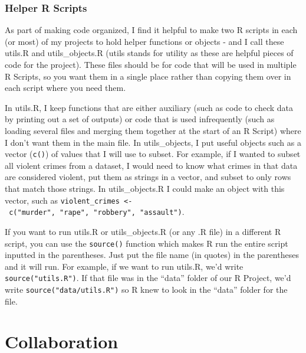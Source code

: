\documentclass[
  12pt,
]{book}
\begin{document}
\hypertarget{helper-r-scripts}{%
\subsection{Helper R Scripts}\label{helper-r-scripts}}

As part of making code organized, I find it helpful to make two R scripts in each (or most) of my projects to hold helper functions or objects - and I call these utils.R and utils\_objects.R (utils stands for utility as these are helpful pieces of code for the project). These files should be for code that will be used in multiple R Scripts, so you want them in a single place rather than copying them over in each script where you need them.

In utils.R, I keep functions that are either auxiliary (such as code to check data by printing out a set of outputs) or code that is used infrequently (such as loading several files and merging them together at the start of an R Script) where I don't want them in the main file. In utils\_objects, I put useful objects such as a vector (\texttt{c()}) of values that I will use to subset. For example, if I wanted to subset all violent crimes from a dataset, I would need to know what crimes in that data are considered violent, put them as strings in a vector, and subset to only rows that match those strings. In utils\_objects.R I could make an object with this vector, such as \texttt{violent\_crimes\ \textless{}-\ c("murder",\ "rape",\ "robbery",\ "assault")}.

If you want to run utils.R or utils\_objects.R (or any .R file) in a different R script, you can use the \texttt{source()} function which makes R run the entire script inputted in the parentheses. Just put the file name (in quotes) in the parentheses and it will run. For example, if we want to run utils.R, we'd write \texttt{source("utils.R")}. If that file was in the ``data'' folder of our R Project, we'd write \texttt{source("data/utils.R")} so R knew to look in the ``data'' folder for the file.

\hypertarget{collaboration}{%
\chapter{Collaboration}\label{collaboration}}
\end{document}
